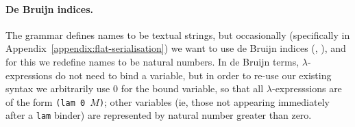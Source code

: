 \paragraph{De Bruijn indices.}
The grammar defines names to be textual strings, but occasionally (specifically
in Appendix~\ref{appendix:flat-serialisation}) we want to use de Bruijn indices
(\cite{deBruijn}, \cite[C.3]{Barendregt}), and for this we redefine names to be
natural numbers.  In de Bruijn terms, $\lambda$-expressions do not need to bind
a variable, but in order to re-use our existing syntax we arbitrarily use 0 for
the bound variable, so that all $\lambda$-expresssions are of the form
\texttt{(lam 0 $M$)}; other variables (ie, those not appearing immediately after
a \texttt{lam} binder) are represented by natural number greater than zero.
